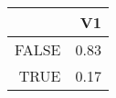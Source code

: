\begin{table}[ht]
\centering
\begin{tabular}{rr}
  \hline
 & V1 \\ 
  \hline
FALSE & 0.83 \\ 
  TRUE & 0.17 \\ 
   \hline
\end{tabular}
\end{table}
